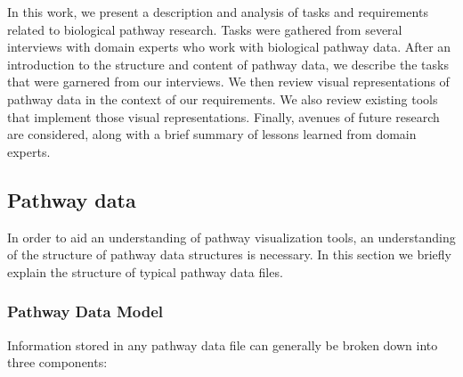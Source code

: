 \documentclass{egpubl}
\begin{document}



In this work, we present a description and analysis of tasks and requirements related to biological pathway research.
Tasks were gathered from several interviews with domain experts who work with biological pathway data.
After an introduction to the structure and content of pathway data, we describe the tasks that were garnered from our interviews.
We then review visual representations of pathway data in the context of our requirements.
We also review existing tools that implement those visual representations.
Finally, avenues of future research are considered, along with a brief summary of lessons learned from domain experts.

\subsection{Pathway data}

In order to aid an understanding of pathway visualization tools, an understanding of the structure of pathway data structures is necessary.
In this section we briefly explain the structure of typical pathway data files.

\subsubsection{Pathway Data Model}

Information stored in any pathway data file can generally be broken down into three components:
\end{document}
